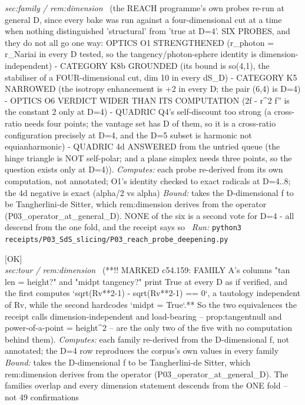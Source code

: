 \begin{description}
\textit{sec:family / rem:dimension} \ (the REACH programme's own probes re-run at general D, since every bake was run against a four-dimensional cut at a time when nothing distinguished 'structural' from 'true at D=4'. SIX PROBES, and they do not all go one way: OPTICS O1 STRENGTHENED (r\_photon = r\_Nariai in every D tested, so the tangency/photon-sphere identity is dimension-independent) - CATEGORY K8b GROUNDED (its bound is so(4,1), the stabiliser of a FOUR-dimensional cut, dim 10 in every dS\_D) - CATEGORY K5 NARROWED (the isotropy enhancement is +2 in every D; the pair (6,4) is D=4) - OPTICS O6 VERDICT WIDER THAN ITS COMPUTATION (2f - r\textasciicircum{}2 f'' is the constant 2 only at D=4) - QUADRIC Q4's self-discount too strong (a cross-ratio needs four points; the vantage set has D of them, so it is a cross-ratio configuration precisely at D=4, and the D=5 subset is harmonic not equianharmonic) - QUADRIC 4d ANSWERED from the untried queue (the hinge triangle is NOT self-polar; and a plane simplex needs three points, so the question exists only at D=4)). 
\emph{Computes:} each probe re-derived from its own computation, not annotated; O1's identity checked to exact radicals at D=4..8; the 4d negative is exact (alpha/2 vs alpha)
 \emph{Bound:} takes the D-dimensional f to be Tangherlini-de Sitter, which rem:dimension derives from the operator (P03\_operator\_at\_general\_D). NONE of the six is a second vote for D=4 - all descend from the one fold, and the receipt says so
\ \emph{Run:} \texttt{python3 receipts/P03\_SdS\_slicing/P03\_reach\_probe\_deepening.py}
\item[\rcptlabel{P03_step3_sweep}{P3R57}\textbf{P3R57}\quad\texttt{P03\_step3\_sweep}]\hfill\textsf{[OK]}\\
\textit{sec:tour / rem:dimension} \ (**!! MARKED c54.159: FAMILY A's columns "tan len = height?" and "midpt tangency?" print True at every D as if verified, and the first computes `sqrt(Rv**2-1) - sqrt(Rv**2-1) == 0`, a tautology independent of Rv, while the second hardcodes `midpt = True`.** So the two equivalences the receipt calls dimension-independent and load-bearing -- prop:tangentnull and power-of-a-point = height\textasciicircum{}2 -- are the only two of the five with no computation behind them). 
\emph{Computes:} each family re-derived from the D-dimensional f, not annotated; the D=4 row reproduces the corpus's own values in every family
 \emph{Bound:} takes the D-dimensional f to be Tangherlini-de Sitter, which rem:dimension derives from the operator (P03\_operator\_at\_general\_D). The families overlap and every dimension statement descends from the ONE fold -- not 49 confirmations

\end{description}
